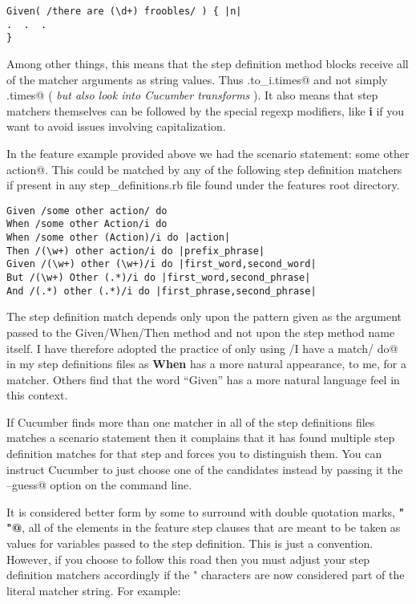 \begin{verbatim}
Given( /there are (\d+) froobles/ ) { |n|
.  .  .
}
\end{verbatim}
Among other things, this means that the step definition method blocks receive all of the matcher arguments as string values.  Thus \verb@n.to_i.times@ and not simply \verb@n.times@ ( \emph{but also look into Cucumber transforms} ).  It also means that step matchers themselves can be followed by the special regexp modifiers, like \textbf{i} if you want to avoid issues involving capitalization.

In the feature example provided above we had the scenario statement: \verb@And some other action@.  This could be matched by any of the following step definition matchers if present in any step\_definitions.rb file found under the features root directory.
\begin{verbatim}
Given /some other action/ do
When /some other Action/i do 
When /some other (Action)/i do |action|
Then /(\w+) other action/i do |prefix_phrase|
Given /(\w+) other (\w+)/i do |first_word,second_word|
But /(\w+) Other (.*)/i do |first_word,second_phrase|
And /(.*) other (.*)/i do |first_phrase,second_phrase|

\end{verbatim}

The step definition match depends only upon the pattern given as the argument passed to the Given/When/Then method and not upon the step method name itself.  I have therefore adopted the practice of only using \verb@When /I have a match/ do@ in my step definitions files as \textbf{When} has a more natural appearance, to me, for a matcher.  Others find that the word ``Given'' has a more natural language feel in this context.

If Cucumber finds more than one matcher in all of the step definitions files matches a scenario statement then it complains that it has found multiple step definition matches for that step and forces you to distinguish them.  You can instruct Cucumber to just choose one of the candidates instead by passing it the \verb@--guess@ option on the command line.

It is considered better form by some to surround with double quotation marks, \textbf{\verb@" "@}, all of the elements in the feature step clauses that are meant to be taken as values for variables passed to the step definition. This is just a convention.  However, if you choose to follow this road then you must adjust your step definition matchers accordingly if the " characters are now considered part of the literal matcher string.  For example:

